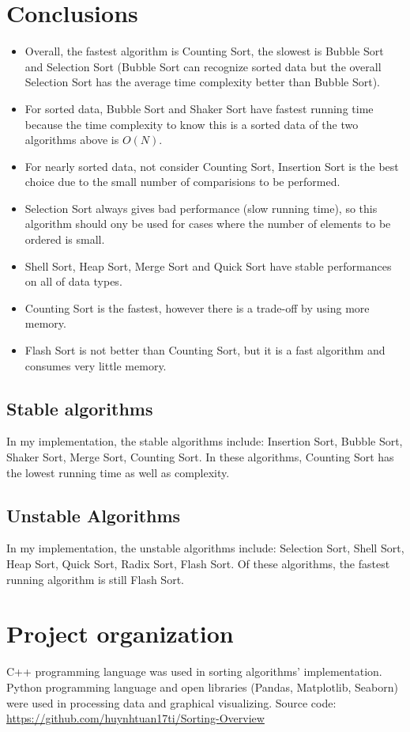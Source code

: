 \documentclass[11pt,a4paper]{article}
\begin{document}
\section{Conclusions}
\begin{itemize}
\item Overall, the fastest algorithm is Counting Sort, the slowest is Bubble Sort and Selection Sort (Bubble Sort can recognize sorted data but the 
overall Selection Sort has the average time complexity better than Bubble Sort).
\item For sorted data, Bubble Sort and Shaker Sort have fastest running time because the time complexity to know this is a sorted data of the two algorithms above is $O(N)$.
\item For nearly sorted data, not consider Counting Sort, Insertion Sort is the best choice due to the small number of comparisions to be performed.
\item Selection Sort always gives bad performance (slow running time), so this algorithm should ony be used for cases where the number of elements to 
be ordered is small.
\item Shell Sort, Heap Sort, Merge Sort and Quick Sort have stable performances on all of data types.
\item Counting Sort is the fastest, however there is a trade-off by using more memory.
\item Flash Sort is not better than Counting Sort, but it is a fast algorithm and consumes very little memory.
\end{itemize}

\subsection{Stable algorithms}
In my implementation, the stable algorithms include: Insertion Sort, Bubble Sort, Shaker Sort, Merge Sort, Counting Sort.
In these algorithms, Counting Sort has the lowest running time as well as complexity.

\subsection{{Unstable Algorithms}}
In my implementation, the unstable algorithms include: Selection Sort, Shell Sort, Heap Sort, 
Quick Sort, Radix Sort, Flash Sort. Of these algorithms, the fastest running algorithm is still Flash Sort.

\section{Project organization}
C++ programming language was used in sorting algorithms' implementation.
Python programming language and open libraries (Pandas, Matplotlib, Seaborn) were used in processing data and graphical visualizing.
\newline
Source code: \url{https://github.com/huynhtuan17ti/Sorting-Overview}
\end{document}
